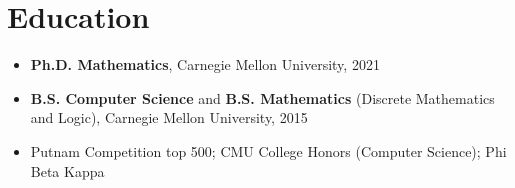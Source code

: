 \documentclass[letterpaper,10pt]{article}
\begin{document}
\section{Education}

\begin{itemize}
  \item \textbf{Ph.D. Mathematics}, Carnegie Mellon University, 2021
  \item \textbf{B.S. Computer Science} and \textbf{B.S. Mathematics}
        (Discrete Mathematics and Logic), Carnegie Mellon University, 2015
  \item Putnam Competition top 500; CMU College Honors (Computer Science);
        Phi Beta Kappa
\end{itemize}
\end{document}
